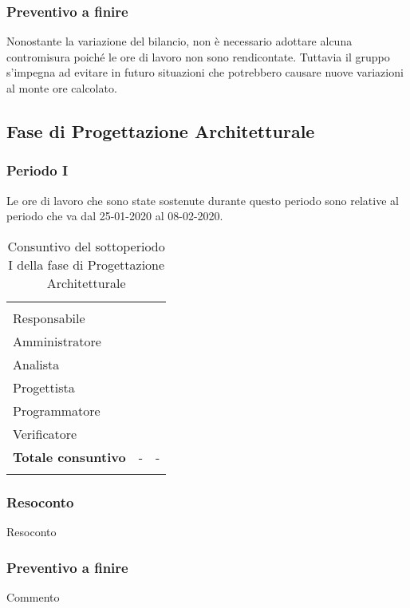 \subsubsection{Preventivo a finire}
Nonostante la variazione del bilancio, non è necessario adottare alcuna contromisura poiché le ore di lavoro non sono rendicontate. Tuttavia il gruppo s'impegna ad evitare in futuro situazioni che potrebbero causare nuove variazioni al monte ore calcolato.

\subsection{Fase di Progettazione Architetturale}

\subsubsection{Periodo I}

Le ore di lavoro che sono state sostenute durante questo periodo sono relative al periodo che va dal 25-01-2020 al 08-02-2020.

\begin{longtable}{ C{4cm} C{3cm} C{3.5cm}} 
 	 &
 	 &
 	 \\
 	
 	Responsabile &  & \\
 	Amministratore &  & \\
 	Analista & & \\
 	Progettista & & \\
 	Programmatore & &\\
 	Verificatore & & \\
 	
	\hline 	
 	
 	\textbf{Totale consuntivo} &
	- \color{coloreRosso}{\textbf{(+--)}} &
 	- \\	
 	
 	\caption{Consuntivo del sottoperiodo I della fase di Progettazione Architetturale}
\end{longtable}

\vspace{-1cm}

\subsubsection{Resoconto}
Resoconto
\subsubsection{Preventivo a finire}
Commento

